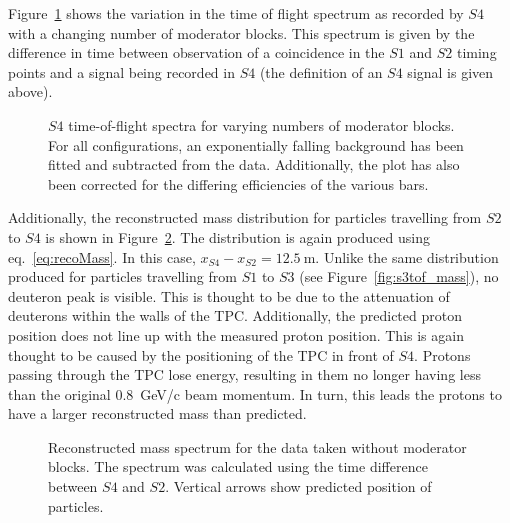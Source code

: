 Figure~\ref{fig:s4tof} shows the variation in the time of flight spectrum as recorded by $\mathit{S4}$ with a changing number of moderator blocks.
This spectrum is given by the difference in time between observation of a coincidence in the $\mathit{S1}$ and $\mathit{S2}$ timing points and a signal being recorded in $\mathit{S4}$ (the definition of an $\mathit{S4}$ signal is given above).

\begin{figure}[h]
  \begin{adjustbox}{max totalsize={.8\textwidth}{.5\textheight},center}
    
  \end{adjustbox}
  \caption{$\mathit{S4}$ time-of-flight spectra for varying numbers of moderator blocks. For all configurations, an exponentially falling background has been fitted and subtracted from the data. Additionally, the plot has also been corrected for the differing efficiencies of the various bars.}
  \label{fig:s4tof}	
\end{figure}

Additionally, the reconstructed mass distribution for particles travelling from $\mathit{S2}$ to $\mathit{S4}$ is shown in Figure~\ref{fig:s4tof_mass}. 
The distribution is again produced using eq.~\ref{eq:recoMass}.
In this case, $x_{\mathit{S4}}-x_{\mathit{S2}} = 12.5~\text{m}$.
Unlike the same distribution produced for particles travelling from $\mathit{S1}$ to $\mathit{S3}$ (see Figure~\ref{fig:s3tof_mass}), no deuteron peak is visible.
This is thought to be due to the attenuation of deuterons within the walls of the TPC.
Additionally, the predicted proton position does not line up with the measured proton position. 
This is again thought to be caused by the positioning of the TPC in front of $\mathit{S4}$.
Protons passing through the TPC lose energy, resulting in them no longer having less than the original 0.8~GeV/c beam momentum.
In turn, this leads the protons to have a larger reconstructed mass than predicted.

\begin{figure}[h]
  \centering
  \begin{adjustbox}{max totalsize={.8\textwidth}{.5\textheight},center}
    
  \end{adjustbox}
  \caption{Reconstructed mass spectrum for the data taken without moderator blocks. The spectrum was calculated using the time difference between $\mathit{S4}$ and $\mathit{S2}$. Vertical arrows show predicted position of particles.}
  \label{fig:s4tof_mass}
\end{figure}

